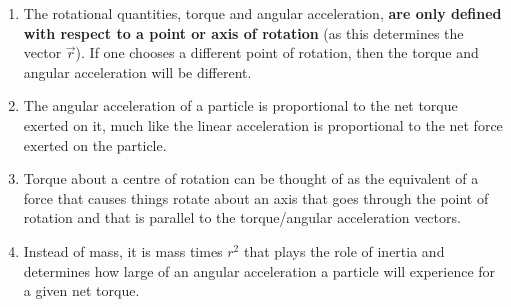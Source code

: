 \begin{enumerate}
\item The rotational quantities, torque and angular acceleration, \textbf{are only defined with respect to a point or axis of rotation} (as this determines the vector $\vec r$). If one chooses a different point of rotation, then the torque and angular acceleration will be different.
\item The angular acceleration of a particle is proportional to the net torque exerted on it, much like the linear acceleration is proportional to the net force exerted on the particle.
\item Torque about a centre of rotation can be thought of as the equivalent of a force that causes things rotate about an axis that goes through the point of rotation and that is parallel to the torque/angular acceleration vectors.
\item Instead of mass, it is mass times $r^2$ that plays the role of inertia and determines how large of an angular acceleration a particle will experience for a given net torque.
\end{enumerate}


